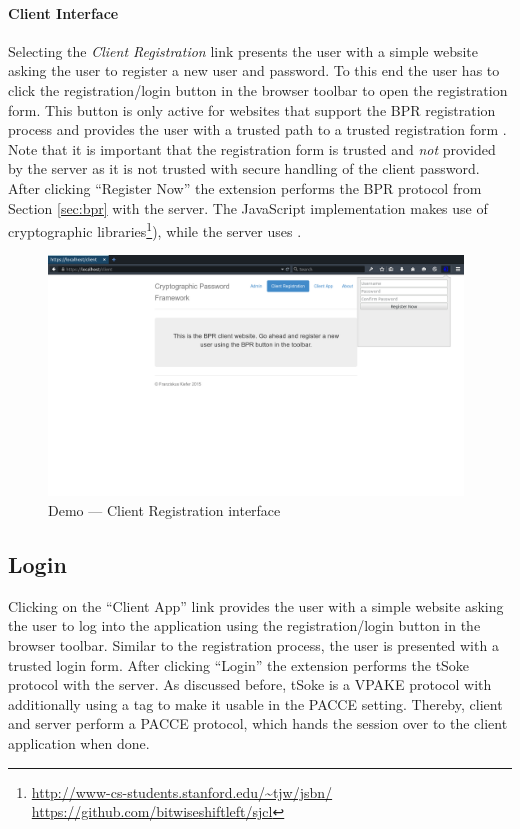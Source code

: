 \paragraph{Client Interface}
Selecting the \emph{Client Registration} link presents the user with a simple website asking the user to register a new user and password.
To this end the user has to click the registration/login button in the browser toolbar to open the registration form.
This button is only active for websites that support the \ac{BPR} registration process and provides the user with a trusted path to a trusted registration form \cite{}.
Note that it is important that the registration form is trusted and \emph{not} provided by the server as it is not trusted with secure handling of the client password.
After clicking ``Register Now'' the extension performs the \ac{BPR} protocol from Section \ref{sec:bpr} with the server.
The JavaScript implementation makes use of cryptographic libraries\footnote{\url{http://www-cs-students.stanford.edu/~tjw/jsbn/}\\\url{https://github.com/bitwiseshiftleft/sjcl}}), while the server uses \cite{charm13}.

\begin{figure}[tbph]
\centering
\includegraphics[width=0.98\textwidth]{Figs/demo-register-popup.png}
\caption{Demo --- Client Registration interface}\label{fig:demo-register}
\end{figure}

\subsection{Login}
Clicking on the ``Client App'' link provides the user with a simple website asking the user to log into the application using the registration/login button in the browser toolbar.
Similar to the registration process, the user is presented with a trusted login form.
After clicking ``Login'' the extension performs the tSoke protocol with the server.
As discussed before, tSoke is a \ac{VPAKE} protocol with additionally using a tag to make it usable in the \ac{PACCE} setting.
Thereby, client and server perform a \ac{PACCE} protocol, which hands the session over to the client application when done.

